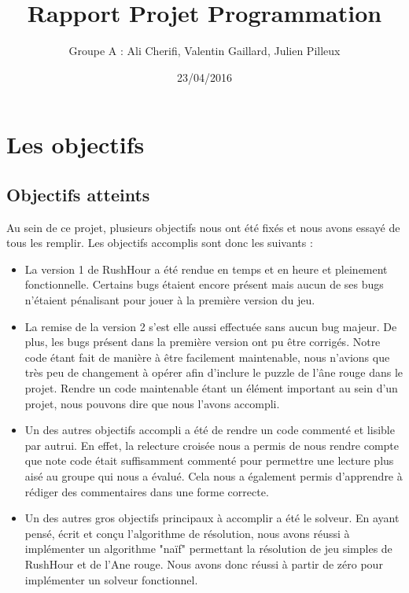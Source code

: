\documentclass{article}
\title{Rapport Projet Programmation}
\author{Groupe A : Ali Cherifi, Valentin Gaillard, Julien Pilleux}
\date{23/04/2016}
\begin{document}
\maketitle

\newpage

\section {Les objectifs}
\subsection {Objectifs atteints}
Au sein de ce projet, plusieurs objectifs nous ont été fixés et nous avons essayé de tous les remplir.
Les objectifs accomplis sont donc les suivants : \\
\begin{itemize}
\item La version 1 de RushHour a été rendue en temps et en heure et pleinement fonctionnelle. Certains bugs étaient encore présent mais aucun de ses bugs n'étaient pénalisant pour jouer à la première version du jeu.\\

\item La remise de la version 2 s'est elle aussi effectuée sans aucun bug majeur. De plus, les bugs présent dans la première version ont pu être corrigés. Notre code étant fait de manière à être facilement maintenable, nous n'avions que très peu de changement à opérer afin d'inclure le puzzle de l'âne rouge dans le projet. Rendre un code maintenable étant un élément important au sein d'un projet, nous pouvons dire que nous l'avons accompli.\\

\item Un des autres objectifs accompli a été de rendre un code commenté et lisible par autrui. En effet, la relecture croisée nous a permis de nous rendre compte que note code était suffisamment commenté pour permettre une lecture plus aisé au groupe qui nous a évalué. Cela nous a également permis d'apprendre à rédiger des commentaires dans une forme correcte.\\

\item  Un des autres gros objectifs principaux à accomplir a été le solveur. En ayant pensé, écrit et conçu l'algorithme de résolution, nous avons réussi à implémenter un algorithme "naïf" permettant la résolution de jeu simples de RushHour et de l'Ane rouge. Nous avons donc réussi à partir de zéro pour implémenter un solveur fonctionnel.\\


\end{itemize}
\end{document}

